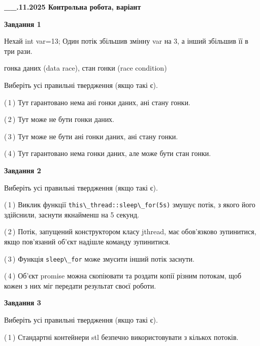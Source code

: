 \documentclass[12pt, ukrainian]{article}
\def\code#1{\Verb!#1!}
\begin{document}
\begin {large}

\textbf{\_\_.11.2025 Контрольна робота, варіант  }\par


{

\begin{center}
\textbf{Завдання 1}
\end{center}
Нехай int var=13; Один потік збільшив змінну var на 3, а інший збільшив її в три рази.

гонка даних (data race), стан гонки (race condition)

Виберіть усі правильні твердження (якщо такі є).\par
\vspace{2mm}
(\,1\,) Тут гарантовано нема ані гонки даних, ані стану гонки.%

(\,2\,) Тут може не бути гонки даних.%

(\,3\,) Тут може не бути ані гонки даних, ані стану гонки.%

(\,4\,) Тут гарантовано нема гонки даних, але може бути стан гонки.%



\begin{center}
\textbf{Завдання 2}
\end{center}
Виберіть усі правильні твердження (якщо такі є).\par
\vspace{2mm}

(\,1\,) Виклик функції \code{this\_thread::sleep\_for(5s)} змушує потік, з якого його здійснили, заснути якнайменш на 5 секунд.%

(\,2\,) Потік, запущений конструктором класу jthread, має обов’язково зупинитися, якщо пов’язаний об’єкт надішле команду зупинитися.%

(\,3\,) Функція \code{sleep\_for} може змусити інший потік заснути.%

(\,4\,) Об’єкт promise можна скопіювати та роздати копії різним потокам, щоб кожен з них міг передати результат своєї роботи.%



\begin{center}
\textbf{Завдання 3}
\end{center}
Виберіть усі правильні твердження (якщо такі є).\par
\vspace{2mm}

(\,1\,) Стандартні контейнери stl безпечно використовувати з кількох потоків.%

}
\end{large}
\end{document}
